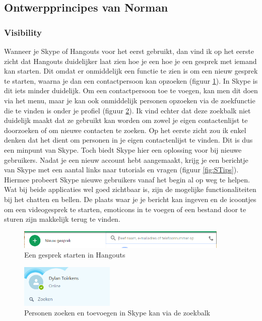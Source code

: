 \documentclass[11pt]{article}
\begin{document}
\subsection{Ontwerpprincipes van Norman}
\subsubsection{Visibility}
Wanneer je Skype of Hangouts voor het eerst gebruikt, dan vind ik op het eerste zicht dat Hangouts duidelijker laat zien hoe je een hoe je een gesprek met iemand kan starten. Dit omdat er onmiddelijk een functie te zien is om een nieuw gesprek te starten, waarna je dan een contactpersoon kan opzoeken (figuur \ref{fig:HNieuwGesprek}). In Skype is dit iets minder duidelijk. Om een contactpersoon toe te voegen, kan men dit doen via het menu, maar je kan ook onmiddelijk personen opzoeken via de zoekfunctie die te vinden is onder je profiel (figuur \ref{fig:SZoeken}). Ik vind echter dat deze zoekbalk niet duidelijk maakt dat ze gebruikt kan worden om zowel je eigen contactenlijst te doorzoeken of om nieuwe contacten te zoeken. Op het eerste zicht zou ik enkel denken dat het dient om personen in je eigen contactenlijst te vinden. Dit is dus een minpunt van Skype. Toch biedt Skype hier een oplossing voor bij nieuwe gebruikers. Nadat je een nieuw account hebt aangemaakt, krijg je een berichtje van Skype met een aantal links naar tutorials en vragen (figuur \ref{fig:STips}). Hiermee probeert Skype nieuwe gebruikers vanaf het begin al op weg te helpen. Wat bij beide applicaties wel goed zichtbaar is, zijn de mogelijke functionaliteiten bij het chatten en bellen. De plaats waar je je bericht kan ingeven en de icoontjes om een videogesprek te starten, emoticons in te voegen of een bestand door te sturen zijn makkelijk terug te vinden. 
 \begin{figure}
	\centering
	\includegraphics[width=0.9\textwidth]{Dylan_HNieuwGesprek.png}
	\caption{Een gesprek starten in Hangouts}
	\label{fig:HNieuwGesprek}
\end{figure}
\begin{figure}
	\centering
	\includegraphics[width=0.4\textwidth]{Dylan_SZoeken.png}
	\caption{Personen zoeken en toevoegen in Skype kan via de zoekbalk}
	\label{fig:SZoeken}
\end{figure}
\end{document}
